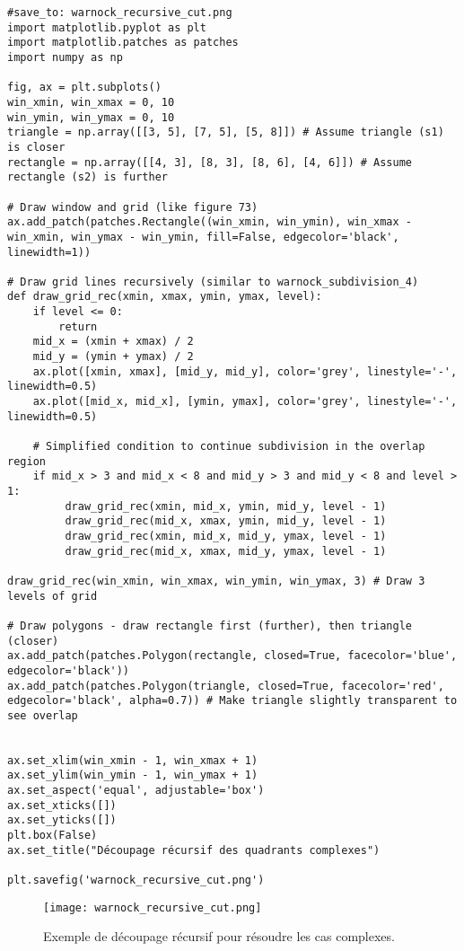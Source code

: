 \documentclass{article}
\begin{document}
\begin{verbatim}
#save_to: warnock_recursive_cut.png
import matplotlib.pyplot as plt
import matplotlib.patches as patches
import numpy as np

fig, ax = plt.subplots()
win_xmin, win_xmax = 0, 10
win_ymin, win_ymax = 0, 10
triangle = np.array([[3, 5], [7, 5], [5, 8]]) # Assume triangle (s1) is closer
rectangle = np.array([[4, 3], [8, 3], [8, 6], [4, 6]]) # Assume rectangle (s2) is further

# Draw window and grid (like figure 73)
ax.add_patch(patches.Rectangle((win_xmin, win_ymin), win_xmax - win_xmin, win_ymax - win_ymin, fill=False, edgecolor='black', linewidth=1))

# Draw grid lines recursively (similar to warnock_subdivision_4)
def draw_grid_rec(xmin, xmax, ymin, ymax, level):
    if level <= 0:
        return
    mid_x = (xmin + xmax) / 2
    mid_y = (ymin + ymax) / 2
    ax.plot([xmin, xmax], [mid_y, mid_y], color='grey', linestyle='-', linewidth=0.5)
    ax.plot([mid_x, mid_x], [ymin, ymax], color='grey', linestyle='-', linewidth=0.5)

    # Simplified condition to continue subdivision in the overlap region
    if mid_x > 3 and mid_x < 8 and mid_y > 3 and mid_y < 8 and level > 1:
         draw_grid_rec(xmin, mid_x, ymin, mid_y, level - 1)
         draw_grid_rec(mid_x, xmax, ymin, mid_y, level - 1)
         draw_grid_rec(xmin, mid_x, mid_y, ymax, level - 1)
         draw_grid_rec(mid_x, xmax, mid_y, ymax, level - 1)

draw_grid_rec(win_xmin, win_xmax, win_ymin, win_ymax, 3) # Draw 3 levels of grid

# Draw polygons - draw rectangle first (further), then triangle (closer)
ax.add_patch(patches.Polygon(rectangle, closed=True, facecolor='blue', edgecolor='black'))
ax.add_patch(patches.Polygon(triangle, closed=True, facecolor='red', edgecolor='black', alpha=0.7)) # Make triangle slightly transparent to see overlap


ax.set_xlim(win_xmin - 1, win_xmax + 1)
ax.set_ylim(win_ymin - 1, win_ymax + 1)
ax.set_aspect('equal', adjustable='box')
ax.set_xticks([])
ax.set_yticks([])
plt.box(False)
ax.set_title("Découpage récursif des quadrants complexes")

plt.savefig('warnock_recursive_cut.png')
\end{verbatim}

\begin{figure}[H]
\centering
\texttt{[image: warnock\_recursive\_cut.png]}
\caption{Exemple de découpage récursif pour résoudre les cas complexes.}
\label{fig:warnock_recursive_cut}
\end{figure}
\end{document}
